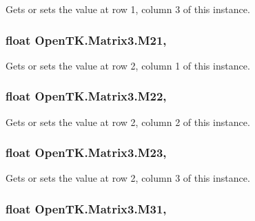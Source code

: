 Gets or sets the value at row 1, column 3 of this instance. 

\hypertarget{struct_open_t_k_1_1_matrix3_a510334b289982d887bdff7bdda6ccd47}{
\subsubsection[{M21}]{\setlength{\rightskip}{0pt plus 5cm}float Open\-T\-K.\-Matrix3.\-M21\hspace{0.3cm}{\ttfamily [get]}, {\ttfamily [set]}}}\label{struct_open_t_k_1_1_matrix3_a510334b289982d887bdff7bdda6ccd47}


Gets or sets the value at row 2, column 1 of this instance. 

\hypertarget{struct_open_t_k_1_1_matrix3_ac60318d4f1db6d22d807f51a96b8cb7e}{
\subsubsection[{M22}]{\setlength{\rightskip}{0pt plus 5cm}float Open\-T\-K.\-Matrix3.\-M22\hspace{0.3cm}{\ttfamily [get]}, {\ttfamily [set]}}}\label{struct_open_t_k_1_1_matrix3_ac60318d4f1db6d22d807f51a96b8cb7e}


Gets or sets the value at row 2, column 2 of this instance. 

\hypertarget{struct_open_t_k_1_1_matrix3_a1f59f2bc24469a9714f10531ed0e2b47}{
\subsubsection[{M23}]{\setlength{\rightskip}{0pt plus 5cm}float Open\-T\-K.\-Matrix3.\-M23\hspace{0.3cm}{\ttfamily [get]}, {\ttfamily [set]}}}\label{struct_open_t_k_1_1_matrix3_a1f59f2bc24469a9714f10531ed0e2b47}


Gets or sets the value at row 2, column 3 of this instance. 

\hypertarget{struct_open_t_k_1_1_matrix3_a7f6c3c79262649a0091429fcd03b6ec6}{
\subsubsection[{M31}]{\setlength{\rightskip}{0pt plus 5cm}float Open\-T\-K.\-Matrix3.\-M31\hspace{0.3cm}{\ttfamily [get]}, {\ttfamily [set]}}}\label{struct_open_t_k_1_1_matrix3_a7f6c3c79262649a0091429fcd03b6ec6}


